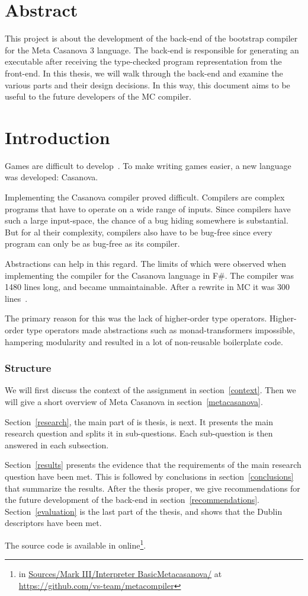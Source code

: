 \section*{Abstract}
This project is about the development of the back-end of the bootstrap compiler for the Meta Casanova 3 language.
The back-end is responsible for generating an executable after receiving the type-checked program representation from the front-end.
In this thesis, we will walk through the back-end and examine the various parts and their design decisions.
In this way, this document aims to be useful to the future developers of the MC compiler.

\section{Introduction}
Games are difficult to develop~\cite{blow}.
To make writing games easier, a new language was developed: Casanova.

Implementing the Casanova compiler proved difficult.
Compilers are complex programs that have to operate on a wide range of inputs.
Since compilers have such a large input-space, the chance of a bug hiding somewhere is substantial. 
But for al their complexity, compilers also have to be bug-free since every program can only be as bug-free as its compiler.

Abstractions can help in this regard.
The limits of which were observed when implementing the compiler for the Casanova language in F\#.
The compiler was 1480 lines long, and became unmaintainable.
After a rewrite in MC it was 300 lines~\cite{maggiore}.

The primary reason for this was the lack of higher-order type operators.
Higher-order type operators made abstractions such as monad-transformers impossible, hampering modularity and resulted in a lot of non-reusable boilerplate code.

\subsubsection{Structure}
We will first discuss the context of the assignment in section~\ref{context}.
Then we will give a short overview of Meta Casanova in section~\ref{metacasanova}.

Section~\ref{research}, the main part of is thesis, is next.
It presents the main research question and splits it in sub-questions.
Each sub-question is then answered in each subsection.

Section~\ref{results} presents the evidence that the requirements of the main research question have been met.
This is followed by conclusions in section~\ref{conclusions} that summarize the results.
After the thesis proper, we give recommendations for the future development of the back-end in section~\ref{recommendations}.
Section~\ref{evaluation} is the last part of the thesis, and shows that the Dublin descriptors have been met.

The source code is available in online\footnote{in \url{Sources/Mark III/Interpreter BasicMetacasanova/} at \url{https://github.com/vs-team/metacompiler}}.
